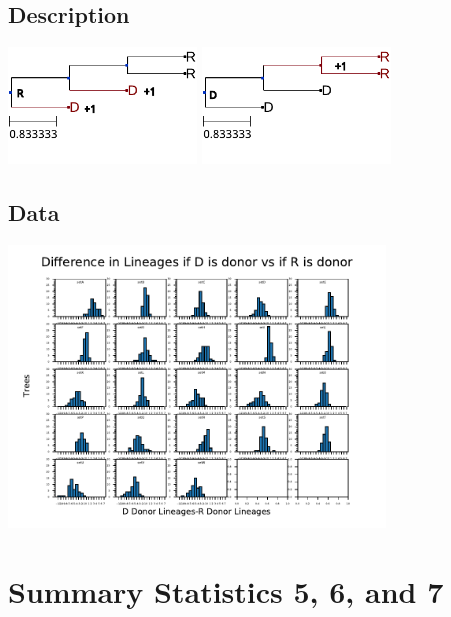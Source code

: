 \documentclass[10pt,aspectratio=169,notheorems,hyperref={pdfauthor=whatever}]{beamer}
\begin{document}
\subsection{Description}
\begin{frame}
  \centering
  \includegraphics[width=5cm, angle=0]{sumstat3example}
  \includegraphics[width=5cm, angle=0]{sumstat3example2}
\end{frame}

\subsection{Data}
\begin{frame}
  \centering
  \includegraphics[width=10cm, angle=0]{sumstat3hist}
\end{frame}

\section{Summary Statistics 5, 6, and 7}
\end{document}
